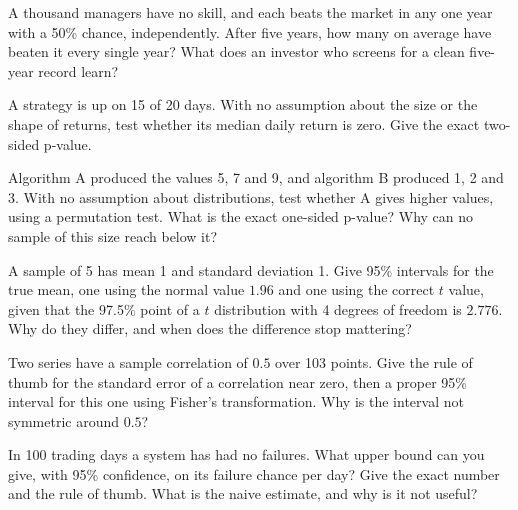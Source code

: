 \begin{question}\label{iq:iv1:statistics:6}
A thousand managers have no skill, and each beats the market in any one year with a 50\% chance, independently. After five years, how many on average have beaten it every single year? What does an investor who screens for a clean five-year record learn?
\end{question}

\begin{question}\label{iq:iv1:statistics:7}
A strategy is up on 15 of 20 days. With no assumption about the size or the shape of returns, test whether its median daily return is zero. Give the exact two-sided p-value.
\end{question}

\begin{question}\label{iq:iv1:statistics:8}
Algorithm A produced the values 5, 7 and 9, and algorithm B produced 1, 2 and 3. With no assumption about distributions, test whether A gives higher values, using a permutation test. What is the exact one-sided p-value? Why can no sample of this size reach below it?
\end{question}

\begin{question}\label{iq:iv1:statistics:9}
A sample of 5 has mean 1 and standard deviation 1. Give 95\% intervals for the true mean, one using the normal value $1.96$ and one using the correct $t$ value, given that the 97.5\% point of a $t$ distribution with 4 degrees of freedom is $2.776$. Why do they differ, and when does the difference stop mattering?
\end{question}

\begin{question}\label{iq:iv1:statistics:10}
Two series have a sample correlation of $0.5$ over 103 points. Give the rule of thumb for the standard error of a correlation near zero, then a proper 95\% interval for this one using Fisher's transformation. Why is the interval not symmetric around $0.5$?
\end{question}

\begin{question}\label{iq:iv1:statistics:11}
In 100 trading days a system has had no failures. What upper bound can you give, with 95\% confidence, on its failure chance per day? Give the exact number and the rule of thumb. What is the naive estimate, and why is it not useful?
\end{question}

